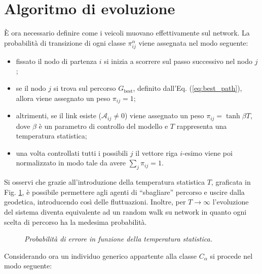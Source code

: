 \documentclass[../main.tex]{subfiles}
\begin{document}
\section{Algoritmo di evoluzione}
\`E ora necessario definire come i veicoli muovano effettivamente sul network.
La probabilit\`a di transizione di ogni classe $\pi_{ij}^{\alpha}$ viene assegnata nel modo seguente:
\begin{itemize}
    \item fissato il nodo di partenza $i$ si inizia a scorrere sul passo successivo nel nodo $j$;
    \item se il nodo $j$ si trova sul percorso $G_{\text{best}}$, definito dall'Eq. (\ref{eq:best_path}), allora viene assegnato un peso $\pi_{ij}=1$;
    \item altrimenti, se il link esiste ($\mathcal{A}_{ij} \neq 0$) viene assegnato un peso $\pi_{ij}=\tanh \beta T$, dove $\beta$ \`e un parametro di controllo del modello e $T$ rappresenta una temperatura statistica;
    \item una volta controllati tutti i possibili $j$ il vettore riga $i$-esimo viene poi normalizzato in modo tale da avere $\sum_j\pi_{ij}=1$.
\end{itemize}
Si osservi che grazie all'introduzione della temperatura statistica $T$, graficata in Fig. \ref{fig:temperature}, \`e possibile permettere agli agenti di ``sbagliare'' percorso e uscire dalla geodetica, introducendo cos\`i delle fluttuazioni.
Inoltre, per $T \to \infty$ l'evoluzione del sistema diventa equivalente ad un random walk su network in quanto ogni scelta di percorso ha la medesima probabilit\`a.
\begin{figure}[H]
    \centering
    \caption[Temperatura statistica]{\emph{Probabilit\`a di errore in funzione della temperatura statistica.}}
    \label{fig:temperature}
\end{figure}
Considerando ora un individuo generico appartente alla classe $C_{\alpha}$ si procede nel modo seguente:
\end{document}
